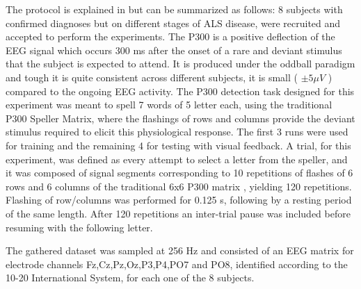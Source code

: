 \documentclass[entropy,article,submit,moreauthors,pdftex,10pt,a4paper]{mdpi}
\begin{document}
The protocol is explained in \citep{Riccio2013} but can be summarized as follows:  8 subjects with confirmed diagnoses but on different stages of ALS disease, were recruited and accepted to perform the experiments. The P300 \citep{Knuth2006} is a positive deflection of the EEG signal which occurs 300 ms after the onset of a rare and deviant stimulus that the subject is expected to attend.  It is produced under the oddball paradigm \cite{WolpawJonathanR2012} and tough it is quite consistent across different subjects, it is small ( $ \pm 5 \mu V $ ) compared to the ongoing EEG activity.  The P300 detection task designed for this experiment was meant to spell 7 words of 5 letter each, using the traditional P300 Speller Matrix, where the flashings of rows and columns provide the deviant stimulus required to elicit this physiological response.  The first 3 runs were used for training and the remaining 4 for testing with visual feedback.  A trial, for this experiment, was defined as every attempt to select a letter from the speller, and it was composed of signal segments corresponding to 10 repetitions of flashes of 6 rows and 6 columns of the traditional 6x6 P300 matrix , yielding 120 repetitions.  Flashing of row/columns was performed for 0.125 s, following by a resting period of the same length.  After 120 repetitions an inter-trial pause was included before resuming with the following letter.

The gathered dataset was sampled at 256 Hz and consisted of an EEG matrix for electrode channels Fz,Cz,Pz,Oz,P3,P4,PO7 and PO8, identified according to the 10-20 International System,  for each one of the 8 subjects.  


%
%
%
%
%
%
%
%
\end{document}
